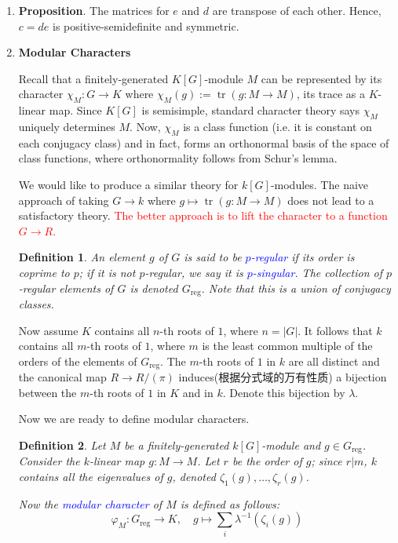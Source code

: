 \documentclass[UTF8]{ctexart}
\DeclareMathOperator{\tr}{tr}
\newcommand{\abs}[1]{\left\lvert#1\right\rvert}
\newtheorem*{defi}{Definition}
\begin{document}
\begin{enumerate}
\item \textbf{Proposition}. The matrices for $e$ and $d$ are transpose of each other. Hence, $c = de$ is positive-semidefinite and symmetric.

\item \textbf{Modular Characters}

Recall that a finitely-generated $K[G]$-module $M$ can be represented by its character $\chi_M : G\to K$ where $\chi_M(g) := \tr(g : M\to M)$, its trace as a $K$-linear map. Since $K[G]$ is semisimple, standard character theory says $\chi_M$ uniquely determines $M$. Now, $\chi_M$ is a class function (i.e. it is constant on each conjugacy class) and in fact, forms an orthonormal basis of the space of class functions, where orthonormality follows from Schur's lemma.

We would like to produce a similar theory for $k[G]$-modules. The naive approach of taking $G\to k$ where $g\mapsto \tr(g:M\to M)$ does not lead to a satisfactory theory. \textcolor{red}{The better approach is to lift the character to a function $G\to R$.}

\begin{defi}
An element $g$ of $G$ is said to be \textcolor{blue}{$p$-regular} if its order is coprime to $p$; if it is not $p$-regular, we say it is \textcolor{blue}{$p$-singular}. The collection of $p$-regular elements of $G$ is denoted $G_{\mathrm{reg}}$. Note that this is a union of conjugacy classes.
\end{defi}

Now assume $K$ contains all $n$-th roots of $1$, where $n = \abs{G}$. It follows that $k$ contains all $m$-th roots of $1$, where $m$ is the least common multiple of the orders of the elements of $G_{\mathrm{reg}}$. The $m$-th roots of $1$ in $k$ are all distinct and the canonical map $R\to R/(\pi)$ induces(根据分式域的万有性质) a bijection between the $m$-th roots of $1$ in $K$ and in $k$. Denote this bijection by $\lambda$.

Now we are ready to define modular characters.

\begin{defi}
Let $M$ be a finitely-generated $k[G]$-module and $g\in G_{\mathrm{reg}}$. Consider the $k$-linear map $g:M\to M$. Let $r$ be the order of $g$; since $r|m$, $k$ contains all the eigenvalues of $g$, denoted $\zeta_1(g), \ldots, \zeta_r(g)$.

Now the \textcolor{blue}{modular character} of $M$ is defined as follows:
\[
\varphi_M : G_{\mathrm{reg}} \to K, \quad g \mapsto \sum_i \lambda^{-1}(\zeta_i(g))
\]
\end{defi}


\end{enumerate}
\end{document}
